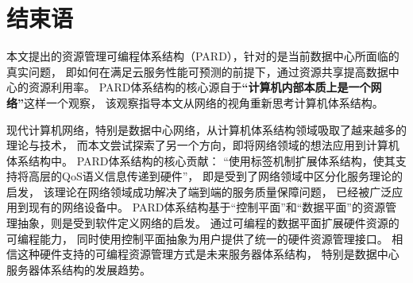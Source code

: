 

\chapter{结束语}
\label{cha:concl}

本文提出的资源管理可编程体系结构（PARD），针对的是当前数据中心所面临的真实问题，
即如何在满足云服务性能可预测的前提下，通过资源共享提高数据中心的资源利用率。
PARD体系结构的核心源自于\textbf{``计算机内部本质上是一个网络''}这样一个观察，
该观察指导本文从网络的视角重新思考计算机体系结构。

现代计算机网络，特别是数据中心网络，从计算机体系结构领域吸取了越来越多的理论与技术，
而本文尝试探索了另一个方向，即将网络领域的想法应用到计算机体系结构中。
PARD体系结构的核心贡献：
``使用标签机制扩展体系结构，使其支持将高层的QoS语义信息传递到硬件''，
即是受到了网络领域中区分化服务理论的启发，
该理论在网络领域成功解决了端到端的服务质量保障问题，
已经被广泛应用到现有的网络设备中。
PARD体系结构基于``控制平面''和``数据平面''的资源管理抽象，则是受到软件定义网络的启发。
通过可编程的数据平面扩展硬件资源的可编程能力，
同时使用控制平面抽象为用户提供了统一的硬件资源管理接口。
相信这种硬件支持的可编程资源管理方式是未来服务器体系结构，
特别是数据中心服务器体系结构的发展趋势。

